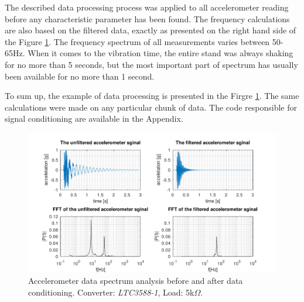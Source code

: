 \documentclass[12pt,a4paper]{article}
\begin{document}
\par
The described data processing process was applied to all accelerometer reading before any characteristic parameter has been found. The frequency calculations are also based on the filtered data, exactly as presented on the right hand side of the Figure \ref{fig:spectrum}. The frequency spectrum of all measurements varies between 50-65Hz. When it comes to the vibration time, the entire stand was always shaking for no more than 5 seconds, but the most important part of spectrum has usually been available for no more than 1 second. 
\par
To sum up, the example of data processing is presented in the Firgre \ref{fig:spectrum}. The same calculations were made on any particular chunk of data. The code responsible for signal conditioning are available in the Appendix.


\begin{landscape}
\begin{figure}[ht!]
\includegraphics[scale=1.2]{spectrum.pdf}
\caption{Accelerometer data spectrum analysis before and after data conditioning. Converter: \textit{LTC3588-1}, Load: 5k$\Omega$.}
\label{fig:spectrum}
\end{figure}
\end{landscape}
\end{document}
